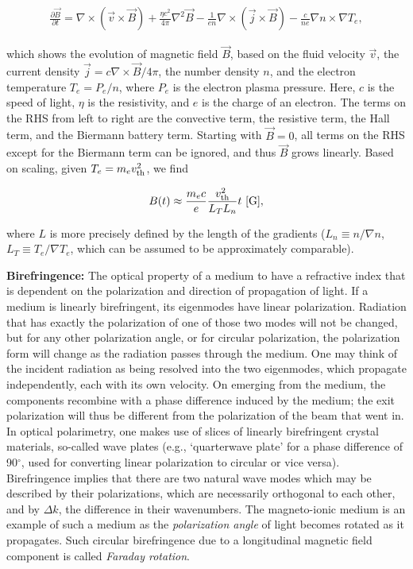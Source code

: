 \documentclass[a4paper,10pt]{article}
\begin{document}
\begin{align*}
    \frac{\partial\vec{B}}{\partial t} = \nabla\times(\vec{v}\times\vec{B}) + \frac{\eta c^2}{4\pi}\nabla^2\vec{B} - \frac{1}{en}\nabla\times(\vec{j}\times\vec{B}) - \frac{c}{ne}\nabla n\times\nabla T_e,
\end{align*}

{\noindent}which shows the evolution of magnetic field $\vec{B}$, based on the fluid velocity $\vec{v}$, the current density $\vec{j}=c\nabla\times\vec{B}/4\pi$, the number density $n$, and the electron temperature $T_e=P_e/n$, where $P_e$ is the electron plasma pressure. Here, $c$ is the speed of light, $\eta$ is the resistivity, and $e$ is the charge of an electron. The terms on the RHS from left to right are the convective term, the resistive term, the Hall term, and the Biermann battery term. Starting with $\vec{B}=0$, all terms on the RHS except for the Biermann term can be ignored, and thus $\vec{B}$ grows linearly. Based on scaling, given $T_e=m_ev_{\rm th}^2$, we find

\begin{align*}
    B(t) \approx \frac{m_ec}{e}\frac{v_{\rm th}^2}{L_TL_n}t ~ [{\rm G}],
\end{align*}

{\noindent}where $L$ is more precisely defined by the length of the gradients ($L_n\equiv n/\nabla n$, $L_T\equiv T_e/\nabla T_e$, which can be assumed to be approximately comparable).

{\noindent}\textbf{Birefringence:} The optical property of a medium to have a refractive index that is dependent on the polarization and direction of propagation of light. If a medium is linearly birefringent, its eigenmodes have linear polarization. Radiation that has exactly the polarization of one of those two modes will not be changed, but for any other polarization angle, or for circular polarization, the polarization form will change as the radiation passes through the medium. One may think of the incident radiation as being resolved into the two eigenmodes, which propagate independently, each with its own velocity. On emerging from the medium, the components recombine with a phase difference induced by the medium; the exit polarization will thus be different from the polarization of the beam that went in. In optical polarimetry, one makes use of slices of linearly birefringent crystal materials, so-called wave plates (e.g., `quarterwave plate' for a phase difference of 90$^\circ$, used for converting linear polarization to circular or vice versa). Birefringence implies that there are two natural wave modes which may be described by their polarizations, which are necessarily orthogonal to each other, and by $\Delta k$, the difference in their wavenumbers. The magneto-ionic medium is an example of such a medium as the \textit{polarization angle} of light becomes rotated as it propagates. Such circular birefringence due to a longitudinal magnetic field component is called \textit{Faraday rotation}.
\end{document}
